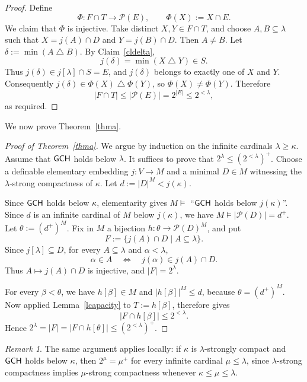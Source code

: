 \documentclass[11pt,reqno]{amsart}
\theoremstyle{definition}
\theoremstyle{remark}
\newtheorem{remark}[thm]{Remark}
\newcommand\symdiff{\mathbin{\bigtriangleup}}
\renewcommand{\mid}{\mathrel{|}\allowbreak}
\newcommand*\axiomfont[1]{\textsf{\textup{#1}}}
\newcommand\gch{\axiomfont{GCH}}
\begin{document}
\begin{proof}
    Define
    $$\Phi:F\cap T\longrightarrow\mathcal P(E),\qquad
        \Phi(X):=X\cap E.$$
    We claim that $\Phi$ is injective.
    Take distinct $X,Y\in F\cap T$, and choose $A,B\subseteq\lambda$ such that
    $X=j(A)\cap D$ and $Y=j(B)\cap D$.
    Then $A\neq B$. Let $\delta:=\min(A\symdiff B)$.
    By Claim~\ref{cldelta},
    $$j(\delta)=\min(X\symdiff Y)\in S.$$
    Thus $j(\delta)\in j[\lambda]\cap S=E$, and $j(\delta)$ belongs to exactly one of $X$ and $Y$.
    Consequently $j(\delta)\in\Phi(X)\symdiff\Phi(Y)$, so $\Phi(X)\neq\Phi(Y)$.
    Therefore
    $$|F\cap T|\le|\mathcal P(E)|=2^{|E|}\le 2^{<\lambda},$$
    as required.
\end{proof}

We now prove Theorem~\ref{thma}.

\begin{proof}[Proof of Theorem~\ref{thma}]
    We argue by induction on the infinite cardinals $\lambda \geq \kappa$.
    Assume that $\gch$ holds below $\lambda$.
    It suffices to prove that $2^\lambda\le (2^{<\lambda})^+$.
    Choose a definable elementary embedding $j:V\rightarrow M$ and a minimal $D\in M$ witnessing the $\lambda$-strong compactness of $\kappa$.
    Let $d:=|D|^M<j(\kappa)$.

    Since $\gch$ holds below $\kappa$, elementarity gives
    $M\models$ ``$\gch$ holds below $j(\kappa)$''.
    Since $d$ is an infinite cardinal of $M$ below $j(\kappa)$,
    we have $M\models|\mathcal P(D)|=d^+$.
    Let $\theta:=(d^+)^M$.
    Fix in $M$ a bijection $h:\theta\rightarrow\mathcal P(D)^M$, and put
    $$F:=\{j(A)\cap D\mid A\subseteq\lambda\}.$$
    Since $j[\lambda]\subseteq D$, for every $A\subseteq\lambda$ and $\alpha<\lambda$,
    $$\alpha\in A\quad\Longleftrightarrow\quad j(\alpha)\in j(A)\cap D.$$
    Thus $A\mapsto j(A)\cap D$ is injective, and $|F|=2^\lambda$.

    For every $\beta<\theta$, we have $h[\beta]\in M$ and $|h[\beta]|^M\le d$, because $\theta=(d^+)^M$.
    Now applied Lemma~\ref{lcapacity} to $T:=h[\beta]$, therefore gives
    $$|F\cap h[\beta]|\le 2^{<\lambda}.$$
    Hence $2^\lambda=|F|=|F\cap h[\theta]|\le (2^{<\lambda})^+$.
\end{proof}

\begin{remark}
    The same argument applies locally:
    if $\kappa$ is $\lambda$-strongly compact and $\gch$ holds below $\kappa$,
    then $2^\mu=\mu^+$ for every infinite cardinal $\mu\le\lambda$,
    since $\lambda$-strong compactness implies $\mu$-strong compactness whenever $\kappa\le\mu\le\lambda$.
\end{remark}
\end{document}
